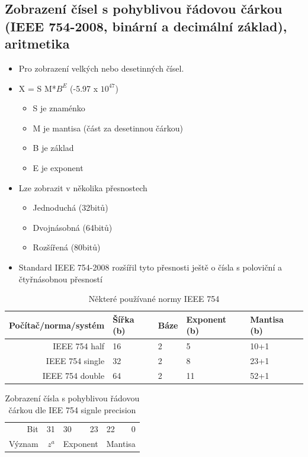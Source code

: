 \documentclass[10pt,a4paper]{article}
\begin{document}
\subsection{Zobrazení čísel s pohyblivou řádovou čárkou (IEEE 754-2008, binární a decimální základ), aritmetika}
\begin{itemize}
\item Pro zobrazení velkých nebo desetinných čísel.
\item X = S M*$B^E$ (-5.97 x $10^47$)
\begin{itemize}
\item S je znaménko
\item M je mantisa (část za desetinnou čárkou)
\item B je základ
\item E je exponent
\end{itemize}
\item Lze zobrazit v několika přesnostech

\begin{itemize}
\item Jednoduchá (32bitů)
\item Dvojnásobná (64bitů)
\item Rozšířená (80bitů)
\end{itemize}
\item Standard IEEE 754-2008 rozšířil tyto přesnosti ještě o čísla s poloviční a čtyřnásobnou přesností
\end{itemize}

\begin{table}[ht]
\centering
\begin{tabular}{r|llll}
\hline
Počítač/norma/systém & Šířka (b) & Báze & Exponent (b) & Mantisa (b) \\
\hline
IEEE 754 half        & 16        & 2    & 5            & 10+1        \\
IEEE 754 single      & 32        & 2    & 8            & 23+1        \\
IEEE 754 double      & 64        & 2    & 11           & 52+1       \\
\hline
\end{tabular}
\caption{Některé používané normy IEEE 754}
\label{tab:iee754}
\end{table}

\begin{table}[ht]
\centering
\begin{tabular}{r|r|lr|lr}
\hline
Bit & 31 & 30  & 23 &22  & 0 \\
Význam & $z^a$ & \multicolumn{2}{c}{Exponent} & \multicolumn{2}{|c}{Mantisa}    \\

\hline
\end{tabular}
\caption{Zobrazení čísla s pohyblivou řádovou čárkou dle IEE 754 signle precision}
\label{tab:floatingPoint}
\end{table}
\end{document}
